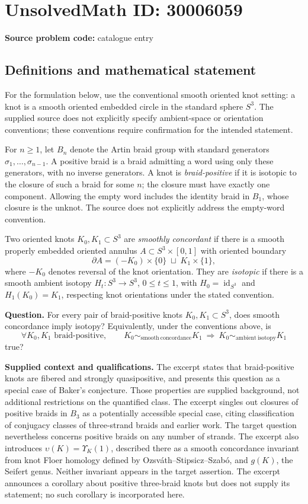 \documentclass[11pt]{article}
\begin{document}
\section*{UnsolvedMath ID: 30006059}
\textbf{Source problem code:} catalogue entry
\subsection{Definitions and mathematical statement}
For the formulation below, use the conventional smooth oriented knot setting: a knot is a smooth oriented embedded circle in the standard sphere \(S^3\). The supplied source does not explicitly specify ambient-space or orientation conventions; these conventions require confirmation for the intended statement.

For \(n\geq 1\), let \(B_n\) denote the Artin braid group with standard generators \(\sigma_1,\ldots,\sigma_{n-1}\). A positive braid is a braid admitting a word using only these generators, with no inverse generators. A knot is \emph{braid-positive} if it is isotopic to the closure of such a braid for some \(n\); the closure must have exactly one component. Allowing the empty word includes the identity braid in \(B_1\), whose closure is the unknot. The source does not explicitly address the empty-word convention.

Two oriented knots \(K_0,K_1\subset S^3\) are \emph{smoothly concordant} if there is a smooth properly embedded oriented annulus \(A\subset S^3\times[0,1]\) with oriented boundary
\[
\partial A=(-K_0)\times\{0\}\;\sqcup\;K_1\times\{1\},
\]
where \(-K_0\) denotes reversal of the knot orientation. They are \emph{isotopic} if there is a smooth ambient isotopy \(H_t:S^3\to S^3\), \(0\leq t\leq1\), with \(H_0=\operatorname{id}_{S^3}\) and \(H_1(K_0)=K_1\), respecting knot orientations under the stated convention.

\textbf{Question.} For every pair of braid-positive knots \(K_0,K_1\subset S^3\), does smooth concordance imply isotopy? Equivalently, under the conventions above, is
\[
\forall K_0,K_1\text{ braid-positive},\qquad
K_0\sim_{\mathrm{smooth\ concordance}}K_1
\ \Longrightarrow\ 
K_0\sim_{\mathrm{ambient\ isotopy}}K_1
\]
true?

\textbf{Supplied context and qualifications.} The excerpt states that braid-positive knots are fibered and strongly quasipositive, and presents this question as a special case of Baker's conjecture. Those properties are supplied background, not additional restrictions on the quantified class. The excerpt singles out closures of positive braids in \(B_3\) as a potentially accessible special case, citing classification of conjugacy classes of three-strand braids and earlier work. The target question nevertheless concerns positive braids on any number of strands. The excerpt also introduces \(\upsilon(K)=\Upsilon_K(1)\), described there as a smooth concordance invariant from knot Floer homology defined by Ozsv\'ath--Stipsicz--Szab\'o, and \(g(K)\), the Seifert genus. Neither invariant appears in the target assertion. The excerpt announces a corollary about positive three-braid knots but does not supply its statement; no such corollary is incorporated here.
\end{document}
